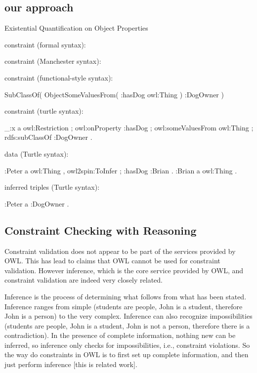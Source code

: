 \documentclass{llncs}
\begin{document}
\subsection{our approach}

Existential Quantification on Object Properties

constraint (formal syntax):
\begin{ex}

\end{ex}

constraint (Manchester syntax):
\begin{ex}

\end{ex}

constraint (functional-style syntax):
\begin{ex}
SubClassOf( ObjectSomeValuesFrom( :hasDog owl:Thing ) :DogOwner ) 
\end{ex}

constraint (turtle syntax):
\begin{ex}
    _:x 
        a owl:Restriction ;
        owl:onProperty :hasDog ;
        owl:someValuesFrom owl:Thing ;
        rdfs:subClassOf :DogOwner .
\end{ex}

data (Turtle syntax):
\begin{ex}
    :Peter 
        a owl:Thing , owl2spin:ToInfer ; 
        :hasDog :Brian . 	
    :Brian
        a owl:Thing .
\end{ex}

inferred triples (Turtle syntax):
\begin{ex}
:Peter a :DogOwner .
\end{ex}

\subsection{Constraint Checking with Reasoning}

Constraint validation does not appear to be part of the services provided by
OWL.  This has lead to claims that OWL cannot be used for constraint
validation.  However inference, which is the core service provided by OWL,
and constraint validation are indeed very closely related.

Inference is the process of determining what follows from what has been
stated.  Inference ranges from simple (students are people, John is a
student, therefore John is a person) to the very complex.  Inference can
also recognize impossibilities (students are people, John is a student, John
is not a person, therefore there is a contradiction).  In the presence of
complete information, nothing new can be inferred, so inference only checks
for impossibilities, i.e., constraint violations.  So the way do constraints
in OWL is to first set up complete information, and then just perform
inference [this is related work].
\end{document}
